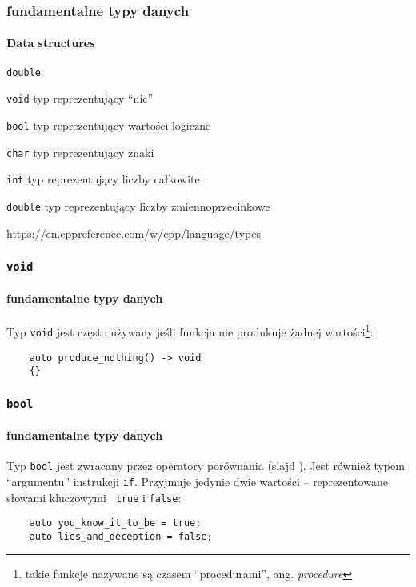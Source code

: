 \documentclass[aspectratio=169]{beamer}
\begin{document}
\begin{frame}
    \frametitle{fundamentalne typy danych}
    \framesubtitle{Data structures}

    \begin{labeling}{{\tt double}}
        \item[{\tt void}] typ reprezentujący ``nic''
        \item[{\tt bool}] typ reprezentujący wartości logiczne
        \item[{\tt char}] typ reprezentujący znaki
        \item[{\tt int}] typ reprezentujący liczby całkowite
        \item[{\tt double}] typ reprezentujący liczby zmiennoprzecinkowe
    \end{labeling}

    \vspace{1em}

    \url{https://en.cppreference.com/w/cpp/language/types}
\end{frame}

\begin{frame}[fragile]
    \frametitle{{\tt void}}
    \framesubtitle{fundamentalne typy danych}

    Typ {\tt void} jest często używany jeśli funkcja nie produkuje żadnej
    wartości\footnote{takie funkcje nazywane są czasem ``procedurami'', ang.
    \emph{procedure}}:

    \begin{lstlisting}
    auto produce_nothing() -> void
    {}
    \end{lstlisting}
\end{frame}

\begin{frame}[fragile]
    \frametitle{{\tt bool}}
    \framesubtitle{fundamentalne typy danych}

    Typ {\tt bool} jest zwracany przez operatory porównania (slajd
    \pageref{selection_comparison_ops}). Jest również typem ``argumentu''
    instrukcji {\tt if}.
    Przyjmuje jedynie dwie wartości -- reprezentowane słowami kluczowymi {\tt
    true} i {\tt false}:

    \begin{lstlisting}
    auto you_know_it_to_be = true;
    auto lies_and_deception = false;
    \end{lstlisting}
\end{frame}
\end{document}
